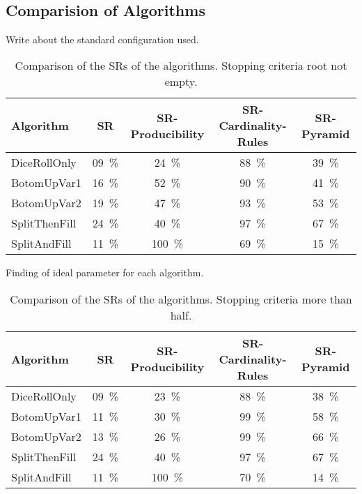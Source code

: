 \noindent
{}
\\


\pagebreak
\subsection{Comparision of Algorithms} \label{ComparisonOfAlgorithms}
\noindent Write about the standard configuration used.
\begin{table}[H]
	\centering
	\begin{tabular}{ | l | c |c |c |c | }
		\hline
Algorithm 		& SR 	& SR-Producibility 	& SR-Cardinality-Rules 	& SR-Pyramid   	\\ \hline
\hline
DiceRollOnly 	& 09~\%	& 24~\% & 88~\% & 39~\%		\\ \hline
BotomUpVar1 	& 16~\% & 52~\% & 90~\% & 41~\% 	\\ \hline
BotomUpVar2 	& 19~\% & 47~\% & 93~\% & 53~\% 	\\ \hline
SplitThenFill 	& 24~\% & 40~\% & 97~\% & 67~\% 	\\ \hline
SplitAndFill 	& 11~\% & 100~\% & 69~\% & 15~\% 	\\ \hline
	\end{tabular}
	\caption{Comparison of the SRs of the algorithms. Stopping criteria root not empty.}
	\label{comparisonAlgorithms}
\end{table}
Finding of ideal parameter for each algorithm.

\begin{table}[H]
	\centering
	\begin{tabular}{ | l | c |c |c |c | }
		\hline
		Algorithm 		& SR 	& SR-Producibility 	& SR-Cardinality-Rules 	& SR-Pyramid   	\\ \hline
		\hline
		DiceRollOnly 	& 09~\%	& 23~\% & 88~\% & 38~\%		\\ \hline
		BotomUpVar1 	& 11~\% & 30~\% & 99~\% & 58~\% 	\\ \hline
		BotomUpVar2 	& 13~\% & 26~\% & 99~\% & 66~\% 	\\ \hline
		SplitThenFill 	& 24~\% & 40~\% & 97~\% & 67~\% 	\\ \hline
		SplitAndFill 	& 11~\% & 100~\% & 70~\% & 14~\% 	\\ \hline
	\end{tabular}
	\caption{Comparison of the SRs of the algorithms. Stopping criteria more than half.}
	\label{comparisonAlgorithms}
\end{table}


